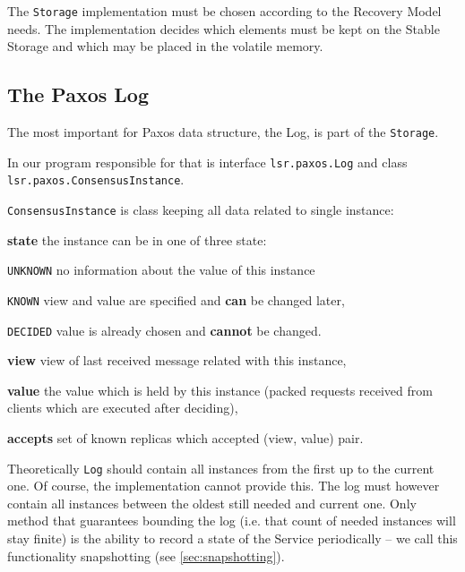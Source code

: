 \strut

The \texttt{Storage} implementation must be chosen according to the Recovery Model needs.
The implementation decides which elements must be kept on the Stable Storage and which may be placed in the volatile memory.

\subsection{The Paxos Log}
\label{subsec:the_paxos_log}
The most important for Paxos data structure, the Log, is part of the \texttt{Storage}.

In our program responsible for that is interface \texttt{lsr.paxos.Log} and class \texttt{lsr.paxos.Con\-sen\-susInstance}.

\texttt{ConsensusInstance} is class keeping all data related to single instance:
\begin{tightList}[\setlength{\itemindent}{0pt}\setlength{\leftmargin}{2\leftmargin}]
  \item[\textbf{state}] the instance can be in one of three state:
  \begin{tightList}[\setlength{\itemindent}{0pt} \setlength{\labelwidth}{7em}]
    \item[\texttt{\tiny UNKNOWN}] no information about the value of this instance
    \item[\texttt{\tiny KNOWN}] view and value are specified and \textbf{can} be changed later,
    \item[\texttt{\tiny DECIDED}] value is already chosen and \textbf{cannot} be changed.
  \end{tightList}
  \item[\textbf{view}] view of last received message related with this instance,
  \item[\textbf{value}] the value which is held by this instance (packed requests received from clients which are executed after deciding),
  \item[\textbf{accepts}] set of known replicas which accepted (view, value) pair.
\end{tightList}

Theoretically \texttt{Log} should contain all instances from the first up to the current one. Of course, the implementation cannot provide this. The log must however contain all instances between the oldest still needed and current one. Only method that guarantees bounding the log (i.e. that count of needed instances will stay finite) is the ability to record a state of the Service periodically -- we call this functionality snapshotting (see \ref{sec:snapshotting}).

